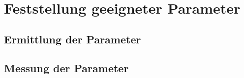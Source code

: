 \section{Feststellung geeigneter Parameter}
\subsection{Ermittlung der Parameter}
\subsection{Messung der Parameter}